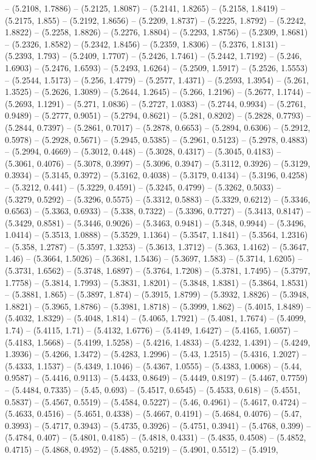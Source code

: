 -- (5.2108, 1.7886) -- (5.2125, 1.8087) -- (5.2141, 1.8265) -- (5.2158, 1.8419) -- (5.2175, 1.855) -- (5.2192, 1.8656) -- (5.2209, 1.8737) -- (5.2225, 1.8792) -- (5.2242, 1.8822) -- (5.2258, 1.8826) -- (5.2276, 1.8804) -- (5.2293, 1.8756) -- (5.2309, 1.8681) -- (5.2326, 1.8582) -- (5.2342, 1.8456) -- (5.2359, 1.8306) -- (5.2376, 1.8131) -- (5.2393, 1.793) -- (5.2409, 1.7707) -- (5.2426, 1.7461) -- (5.2442, 1.7192) -- (5.246, 1.6903) -- (5.2476, 1.6593) -- (5.2493, 1.6264) -- (5.2509, 1.5917) -- (5.2526, 1.5553) -- (5.2544, 1.5173) -- (5.256, 1.4779) -- (5.2577, 1.4371) -- (5.2593, 1.3954) -- (5.261, 1.3525) -- (5.2626, 1.3089) -- (5.2644, 1.2645) -- (5.266, 1.2196) -- (5.2677, 1.1744) -- (5.2693, 1.1291) -- (5.271, 1.0836) -- (5.2727, 1.0383) -- (5.2744, 0.9934) -- (5.2761, 0.9489) -- (5.2777, 0.9051) -- (5.2794, 0.8621) -- (5.281, 0.8202) -- (5.2828, 0.7793) -- (5.2844, 0.7397) -- (5.2861, 0.7017) -- (5.2878, 0.6653) -- (5.2894, 0.6306) -- (5.2912, 0.5978) -- (5.2928, 0.5671) -- (5.2945, 0.5385) -- (5.2961, 0.5123) -- (5.2978, 0.4883) -- (5.2994, 0.4669) -- (5.3012, 0.448) -- (5.3028, 0.4317) -- (5.3045, 0.4183) -- (5.3061, 0.4076) -- (5.3078, 0.3997) -- (5.3096, 0.3947) -- (5.3112, 0.3926) -- (5.3129, 0.3934) -- (5.3145, 0.3972) -- (5.3162, 0.4038) -- (5.3179, 0.4134) -- (5.3196, 0.4258) -- (5.3212, 0.441) -- (5.3229, 0.4591) -- (5.3245, 0.4799) -- (5.3262, 0.5033) -- (5.3279, 0.5292) -- (5.3296, 0.5575) -- (5.3312, 0.5883) -- (5.3329, 0.6212) -- (5.3346, 0.6563) -- (5.3363, 0.6933) -- (5.338, 0.7322) -- (5.3396, 0.7727) -- (5.3413, 0.8147) -- (5.3429, 0.8581) -- (5.3446, 0.9026) -- (5.3463, 0.9481) -- (5.348, 0.9944) -- (5.3496, 1.0414) -- (5.3513, 1.0888) -- (5.3529, 1.1364) -- (5.3547, 1.1841) -- (5.3564, 1.2316) -- (5.358, 1.2787) -- (5.3597, 1.3253) -- (5.3613, 1.3712) -- (5.363, 1.4162) -- (5.3647, 1.46) -- (5.3664, 1.5026) -- (5.3681, 1.5436) -- (5.3697, 1.583) -- (5.3714, 1.6205) -- (5.3731, 1.6562) -- (5.3748, 1.6897) -- (5.3764, 1.7208) -- (5.3781, 1.7495) -- (5.3797, 1.7758) -- (5.3814, 1.7993) -- (5.3831, 1.8201) -- (5.3848, 1.8381) -- (5.3864, 1.8531) -- (5.3881, 1.865) -- (5.3897, 1.874) -- (5.3915, 1.8799) -- (5.3932, 1.8826) -- (5.3948, 1.8821) -- (5.3965, 1.8786) -- (5.3981, 1.8718) -- (5.3999, 1.862) -- (5.4015, 1.8489) -- (5.4032, 1.8329) -- (5.4048, 1.814) -- (5.4065, 1.7921) -- (5.4081, 1.7674) -- (5.4099, 1.74) -- (5.4115, 1.71) -- (5.4132, 1.6776) -- (5.4149, 1.6427) -- (5.4165, 1.6057) -- (5.4183, 1.5668) -- (5.4199, 1.5258) -- (5.4216, 1.4833) -- (5.4232, 1.4391) -- (5.4249, 1.3936) -- (5.4266, 1.3472) -- (5.4283, 1.2996) -- (5.43, 1.2515) -- (5.4316, 1.2027) -- (5.4333, 1.1537) -- (5.4349, 1.1046) -- (5.4367, 1.0555) -- (5.4383, 1.0068) -- (5.44, 0.9587) -- (5.4416, 0.9113) -- (5.4433, 0.8649) -- (5.4449, 0.8197) -- (5.4467, 0.7759) -- (5.4484, 0.7335) -- (5.45, 0.693) -- (5.4517, 0.6545) -- (5.4533, 0.618) -- (5.4551, 0.5837) -- (5.4567, 0.5519) -- (5.4584, 0.5227) -- (5.46, 0.4961) -- (5.4617, 0.4724) -- (5.4633, 0.4516) -- (5.4651, 0.4338) -- (5.4667, 0.4191) -- (5.4684, 0.4076) -- (5.47, 0.3993) -- (5.4717, 0.3943) -- (5.4735, 0.3926) -- (5.4751, 0.3941) -- (5.4768, 0.399) -- (5.4784, 0.407) -- (5.4801, 0.4185) -- (5.4818, 0.4331) -- (5.4835, 0.4508) -- (5.4852, 0.4715) -- (5.4868, 0.4952) -- (5.4885, 0.5219) -- (5.4901, 0.5512) -- (5.4919, 